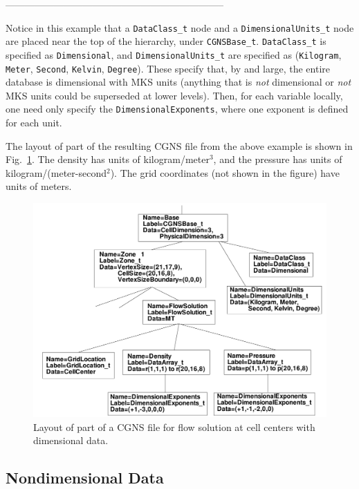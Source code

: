 \documentclass[12pt]{article}
\begin{document}
--------------------------------------------------------------------

Notice in this example that a {\tt DataClass\_t} node and
a {\tt DimensionalUnits\_t} node are placed
near the top of the hierarchy, under {\tt CGNSBase\_t}. 
{\tt DataClass\_t} is specified as {\tt Dimensional}, and
{\tt DimensionalUnits\_t} are specified as ({\tt Kilogram}, {\tt Meter},
{\tt Second}, {\tt Kelvin}, {\tt Degree}).  These specify
that, by and large, the entire database is dimensional with MKS units (anything
that is {\it not} dimensional or {\it not} MKS units could be superseded at lower
levels).  Then, for each variable
locally, one need only specify the {\tt DimensionalExponents}, where
one exponent is defined for each unit.

The layout of part of the resulting CGNS file
from the above example is shown in Fig.~\ref{FIGtree_dimensional}.
The density has units of kilogram/meter$^3$, and the pressure
has units of kilogram/(meter-second$^2$).  The grid coordinates
(not shown in the figure) have units of meters.

\begin{figure}[hpbt]
\centerline{{\includegraphics[width=150mm]{figures/tree_dimensional}}}
\caption{Layout of part of a CGNS file for flow solution at cell centers with
dimensional data.}
\label{FIGtree_dimensional}
\end{figure}
%

\subsection{Nondimensional Data} \label{sec:nondimens}
\end{document}
